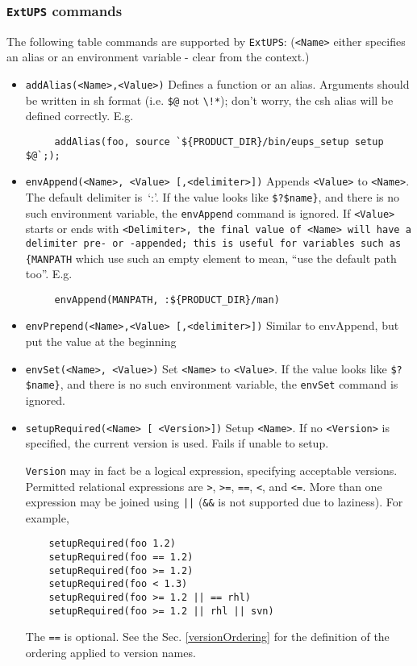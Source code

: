 \documentclass{article}
\newcommand{\code}[1]{\texttt{#1}}
\newcommand{\eups}{\code{ExtUPS}}
\begin{document}
\subsubsection{\eups{} commands}

The following table commands are supported by \eups{}: (\code{<Name>} either specifies an
alias or an environment variable - clear from the context.)

\begin{itemize}
   \item \code{addAlias(<Name>,<Value>)}
     Defines a function or an alias.  Arguments should be written in
     sh format (i.e. \code{\$@} not \code{\textbackslash!*}); don't worry,
     the csh alias will be defined correctly.  E.g.
     \begin{verbatim}
     addAlias(foo, source `${PRODUCT_DIR}/bin/eups_setup setup $@`;);
     \end{verbatim}
    
   \item \code{envAppend(<Name>, <Value> [,<delimiter>])}
     Appends \code{<Value>} to \code{<Name>}. The default delimiter is~`:'.
     If the value looks like \code{\$?\$name\}},
     and there is no such environment variable, the \code{envAppend} command is ignored.
     If \code{<Value>} starts or ends
     with \code{<Delimiter>, the final value of \code{<Name>} will
     have a delimiter pre- or -appended;  this is useful
     for variables such as \{MANPATH} which use such an empty
     element to mean, ``use the default path too''. E.g.
     \begin{verbatim}
     envAppend(MANPATH, :${PRODUCT_DIR}/man)
     \end{verbatim}		%
     
   \item \code{envPrepend(<Name>,<Value> [,<delimiter>])}
     Similar to envAppend, but put the value at the beginning
     
   \item \code{envSet(<Name>, <Value>)}
     Set \code{<Name>} to \code{<Value>}.
     If the value looks like \code{\$?\$name\}},
     and there is no such environment variable, the \code{envSet} command is ignored.
     
   \item \code{setupRequired(<Name> [ <Version>])}
     Setup \code{<Name>}.  If no \code{<Version>} is specified, the current
     version is used. Fails if unable to setup.

     \code{Version} may in fact be a logical expression, specifying acceptable
     versions. Permitted relational expressions are \code{>}, \code{>=}, \code{==},
     \code{<}, and \code{<=}. More than one expression may be joined using \code{||}
     (\code{\&\&} is not supported due to laziness).  For example,
\begin{verbatim}
    setupRequired(foo 1.2)
    setupRequired(foo == 1.2)
    setupRequired(foo >= 1.2)
    setupRequired(foo < 1.3)
    setupRequired(foo >= 1.2 || == rhl)
    setupRequired(foo >= 1.2 || rhl || svn)
\end{verbatim}
    The \code{==} is optional.  See the Sec. \ref{versionOrdering} for the definition
    of the ordering applied to version names.


\end{itemize}
\end{document}
